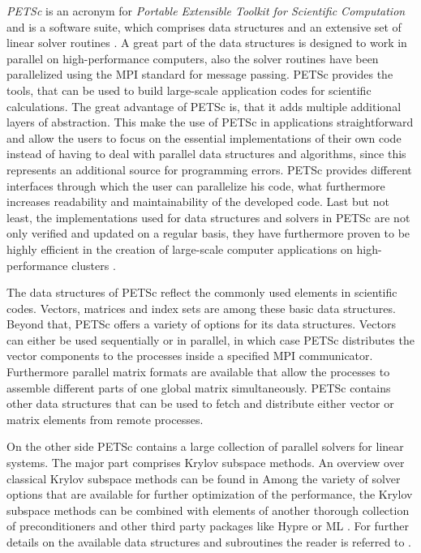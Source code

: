 \emph{PETSc} is an acronym for \emph{Portable Extensible Toolkit for Scientific Computation} and is a software suite, which comprises data structures and an extensive set of linear solver routines \cite{petsc-web-page,petsc-efficient}. A great part of the data structures is designed to work in parallel on high-performance computers, also the solver routines have been parallelized using the MPI standard for message passing. PETSc provides the tools, that can be used to build large-scale application codes for scientific calculations. The great advantage of PETSc is, that it adds multiple additional layers of abstraction. This make the use of PETSc in applications straightforward and allow the users to focus on the essential implementations of their own code instead of having to deal with parallel data structures and algorithms, since this represents an additional source for programming errors. PETSc provides different interfaces through which the user can parallelize his code, what furthermore increases readability and maintainability of the developed code. Last but not least, the implementations used for data structures and solvers in PETSc are not only verified and updated on a regular basis, they have furthermore proven to be highly efficient in the creation of large-scale computer applications on high-performance clusters \cite{bonfiglioli12,gropp00,karimian05}.

The data structures of PETSc reflect the commonly used elements in scientific codes. Vectors, matrices and index sets are among these basic data structures. Beyond that, PETSc offers a variety of options for its data structures. Vectors can either be used sequentially or in parallel, in which case PETSc distributes the vector components to the processes inside a specified MPI communicator. Furthermore parallel matrix formats are available that allow the processes to assemble different parts of one global matrix simultaneously. PETSc contains other data structures that can be used to fetch and distribute either vector or matrix elements from remote processes.

On the other side PETSc contains a large collection of parallel solvers for linear systems. The major part comprises Krylov subspace methods. An overview over classical Krylov subspace methods can be found in \cite{saad03} Among the variety of solver options that are available for further optimization of the performance, the Krylov subspace methods can be combined with elements of another thorough collection of preconditioners and other third party packages like Hypre \cite{hypre} or ML \cite{ml}. For further details on the available data structures and subroutines the reader is referred to \cite{petsc-user-ref,petsc-web-page}.

